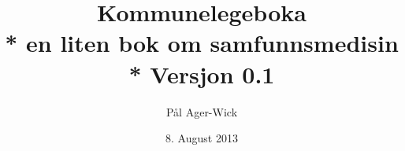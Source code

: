 \documentclass[a4paper]{memoir}
\author{Pål Ager-Wick }
\title {Kommunelegeboka \\* en liten bok om samfunnsmedisin \\* Versjon 0.1}
\date{8. August 2013}
\begin{document}
\renewcommand{\chaptername}{Del}
\renewcommand{\tablename}{Liste:}

\renewcommand{\bibname}{Kilder:}
\renewcommand{\contentsname}{Innhold:}
\renewcommand{\listfigurename}{Oversikt over bilder:}


  

\tableofcontents
\end{document}
